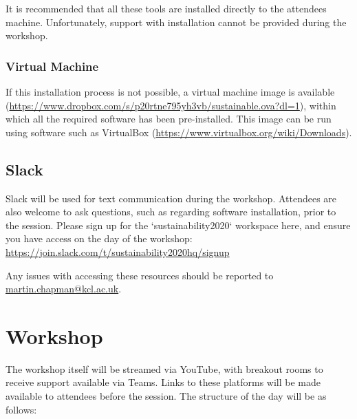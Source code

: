 \documentclass{article}
\begin{document}
It is recommended that all these tools are installed directly to the
attendees machine. Unfortunately, support with installation cannot be
provided during the workshop.

\subsubsection{Virtual Machine}

If this installation process is
not possible, a virtual machine image is available
(\href{https://www.dropbox.com/s/p20rtne795yh3vb/sustainable.ova?dl=1}{https://www.dropbox.com/s/p20rtne795yh3vb/sustainable.ova?dl=1}),
within which all the required software has been pre-installed. This
image can be run using software such as VirtualBox
(\href{https://www.virtualbox.org/wiki/Downloads}{https://www.virtualbox.org/wiki/Downloads}).

\subsection{Slack}

Slack will be used for text communication during the
workshop. Attendees are also welcome to ask questions, such as
regarding software installation, prior to the session. Please
sign up for the `sustainability2020` workspace here, and
ensure you have access on the day of the workshop: \newline
\href{https://join.slack.com/t/sustainability2020hq/signup}{https://join.slack.com/t/sustainability2020hq/signup}

Any issues with accessing these resources should be reported to
\href{mailto:martin.chapman@kcl.ac.uk}{martin.chapman@kcl.ac.uk}.

\section{Workshop}

The workshop itself will be streamed via YouTube, with breakout rooms
to receive support available via Teams. Links to these platforms will
be made available to attendees before the session. The structure of the
day will be as follows:
\end{document}
